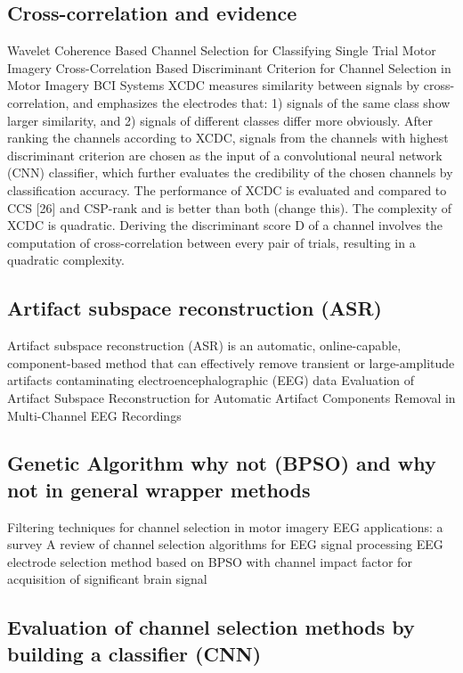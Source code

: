 \documentclass{article}
\begin{document}
\subsection{Cross-correlation and evidence}
{Wavelet Coherence Based Channel Selection for Classifying Single Trial Motor Imagery}
{Cross-Correlation Based Discriminant Criterion for
Channel Selection in Motor Imagery BCI Systems}
XCDC measures similarity between signals by
cross-correlation, and emphasizes the electrodes that:
1) signals of the same class show larger similarity, and
2) signals of different classes differ more obviously.
After ranking the channels according to XCDC, signals
from the channels with highest discriminant criterion
are chosen as the input of a convolutional neural
network (CNN) classifier, which further evaluates the
credibility of the chosen channels by classification
accuracy. The performance of XCDC is evaluated
and compared to CCS [26] and CSP-rank and is better than both (change this).
The complexity of XCDC is quadratic. Deriving
the discriminant score D of a channel involves the
computation of cross-correlation between every pair of
trials, resulting in a quadratic complexity.


\subsection{Artifact subspace reconstruction (ASR)}
Artifact subspace reconstruction (ASR) is an automatic, online-capable, component-based method that can effectively remove transient or large-amplitude artifacts contaminating electroencephalographic (EEG) data
{Evaluation of Artifact Subspace Reconstruction for Automatic Artifact Components Removal in Multi-Channel EEG Recordings}


\subsection{Genetic Algorithm why not (BPSO) and why not in general wrapper methods}
{Filtering techniques for channel selection in motor imagery EEG applications: a survey}
{A review of channel selection algorithms for EEG signal processing}
{EEG electrode selection method based on BPSO with channel impact factor for acquisition of significant brain signal}

\subsection{Evaluation of channel selection methods by building a classifier (CNN)}
\end{document}

